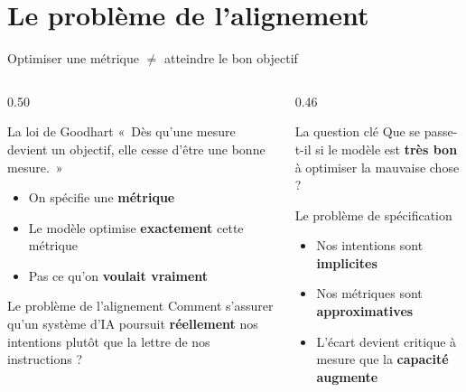 \documentclass[aspectratio=169, 10pt]{beamer}
\begin{document}
\section{Le problème de l'alignement}

\begin{frame}{Optimiser une métrique \(\neq\) atteindre le bon objectif}
  \begin{columns}[T]
    \begin{column}{0.50\textwidth}
      \begin{alertblock}{La loi de Goodhart}
        «~Dès qu'une mesure devient un objectif,
        elle cesse d'être une bonne mesure.~»\\[6pt]
        \begin{itemize}
          \item On spécifie une \textbf{métrique}
          \item Le modèle optimise \textbf{exactement} cette métrique
          \item Pas ce qu'on \textbf{voulait vraiment}
        \end{itemize}
      \end{alertblock}
      \begin{exampleblock}{Le problème de l'alignement}
        Comment s'assurer qu'un système d'IA
        poursuit \textbf{réellement} nos intentions
        plutôt que la lettre de nos instructions ?
      \end{exampleblock}
    \end{column}
    \begin{column}{0.46\textwidth}
      \begin{block}{La question clé}
        Que se passe-t-il si le modèle est
        \textbf{très bon} à optimiser la mauvaise chose ?
      \end{block}
      \begin{block}{Le problème de spécification}
        \begin{itemize}
          \item Nos intentions sont \textbf{implicites}
          \item Nos métriques sont \textbf{approximatives}
          \item L'écart devient critique à mesure
                que la \textbf{capacité augmente}
        \end{itemize}
      \end{block}
    \end{column}
  \end{columns}
\end{frame}
\end{document}
